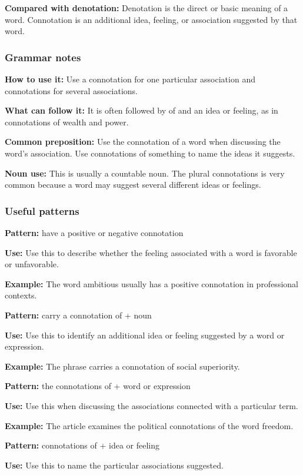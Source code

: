 \documentclass[11pt]{article}
\begin{document}
\textbf{Compared with denotation:} Denotation is the direct or basic meaning of a word. Connotation is an additional idea, feeling, or association suggested by that word.

\subsubsection{Grammar notes}
\textbf{How to use it:} Use a connotation for one particular association and connotations for several associations.

\textbf{What can follow it:} It is often followed by of and an idea or feeling, as in connotations of wealth and power.

\textbf{Common preposition:} Use the connotation of a word when discussing the word's association. Use connotations of something to name the ideas it suggests.

\textbf{Noun use:} This is usually a countable noun. The plural connotations is very common because a word may suggest several different ideas or feelings.

\subsubsection{Useful patterns}
\textbf{Pattern:} have a positive or negative connotation

\textbf{Use:} Use this to describe whether the feeling associated with a word is favorable or unfavorable.

\textbf{Example:} The word ambitious usually has a positive connotation in professional contexts.

\textbf{Pattern:} carry a connotation of + noun

\textbf{Use:} Use this to identify an additional idea or feeling suggested by a word or expression.

\textbf{Example:} The phrase carries a connotation of social superiority.

\textbf{Pattern:} the connotations of + word or expression

\textbf{Use:} Use this when discussing the associations connected with a particular term.

\textbf{Example:} The article examines the political connotations of the word freedom.

\textbf{Pattern:} connotations of + idea or feeling

\textbf{Use:} Use this to name the particular associations suggested.
\end{document}
